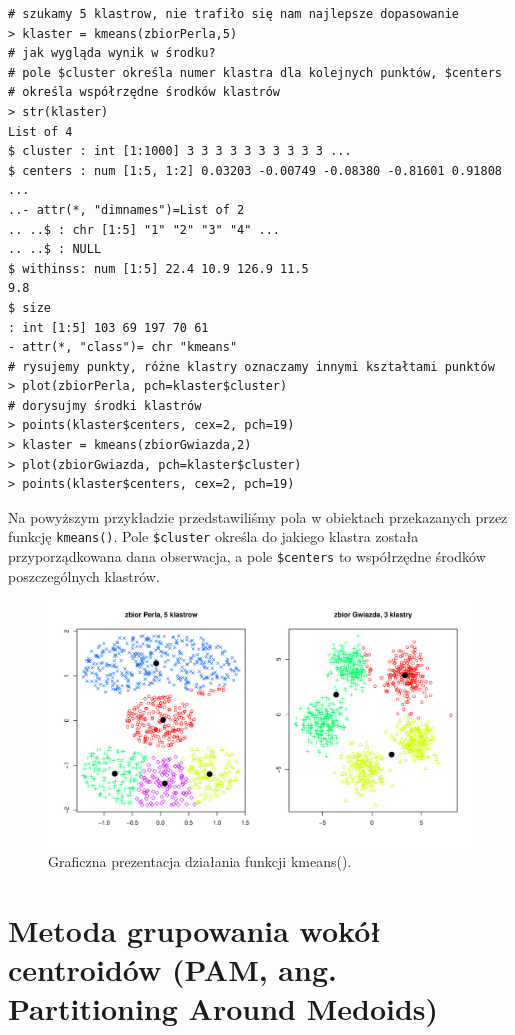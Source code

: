 \documentclass[polish,]{book}
\begin{document}
\begin{verbatim}
# szukamy 5 klastrow, nie trafiło się nam najlepsze dopasowanie
> klaster = kmeans(zbiorPerla,5)
# jak wygląda wynik w środku?
# pole $cluster określa numer klastra dla kolejnych punktów, $centers
# określa współrzędne środków klastrów
> str(klaster)
List of 4
$ cluster : int [1:1000] 3 3 3 3 3 3 3 3 3 3 ...
$ centers : num [1:5, 1:2] 0.03203 -0.00749 -0.08380 -0.81601 0.91808
...
..- attr(*, "dimnames")=List of 2
.. ..$ : chr [1:5] "1" "2" "3" "4" ...
.. ..$ : NULL
$ withinss: num [1:5] 22.4 10.9 126.9 11.5
9.8
$ size
: int [1:5] 103 69 197 70 61
- attr(*, "class")= chr "kmeans"
# rysujemy punkty, różne klastry oznaczamy innymi kształtami punktów
> plot(zbiorPerla, pch=klaster$cluster)
# dorysujmy środki klastrów
> points(klaster$centers, cex=2, pch=19)
> klaster = kmeans(zbiorGwiazda,2)
> plot(zbiorGwiazda, pch=klaster$cluster)
> points(klaster$centers, cex=2, pch=19)
\end{verbatim}

Na powyższym przykładzie przedstawiliśmy pola w obiektach przekazanych przez
funkcję \texttt{kmeans()}. Pole \texttt{\$cluster} określa do jakiego klastra została przyporządkowana dana obserwacja, a pole \texttt{\$centers} to współrzędne środków poszczególnych klastrów.

\begin{figure}

{\centering \includegraphics[width=1\linewidth]{kmeans} 

}

\caption{Graficzna prezentacja działania funkcji kmeans().}\label{fig:kmeans}
\end{figure}

\hypertarget{part_32}{%
\section{Metoda grupowania wokół centroidów (PAM, ang. Partitioning Around Medoids)}\label{part_32}}
\end{document}
